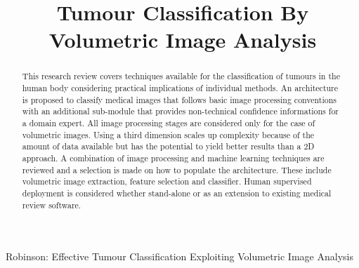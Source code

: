 \documentclass[journal]{IEEEtran}
\begin{document}
\title{Tumour Classification By Volumetric Image Analysis}
\author{
}


{Robinson: Effective Tumour Classification Exploiting Volumetric Image Analysis}

\maketitle


\begin{abstract}

This research review covers techniques available for the classification of tumours in the human body considering practical implications of individual methods.   
An architecture is proposed to classify medical images that follows basic image processing conventions with an additional sub-module that provides non-technical confidence informations for a domain expert.  
All image processing stages are considered only for the case of volumetric images.
Using a third dimension scales up complexity because of the amount of data available but has the potential to yield better results than a 2D approach.
A combination of image processing and machine learning techniques are reviewed and a selection is made on how to populate the architecture.
These include volumetric image extraction, feature selection and classifier. 
Human supervised deployment is considered whether stand-alone or as an extension to existing medical review software.

\end{abstract}










\IEEEpeerreviewmaketitle
\end{document}
